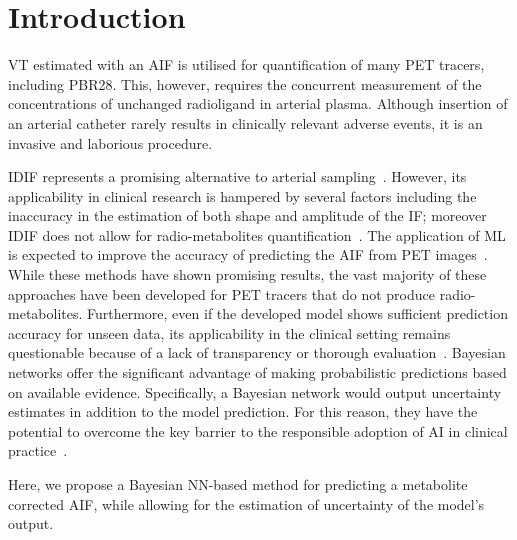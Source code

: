 \vspace{-0.5cm}

\section{Introduction} \label{sec:introduction}\vspace{-0.3cm}\vspace{0.2cm}
     \gls{VT} estimated with an \gls{AIF} is utilised for quantification of many \gls{PET} tracers, including \gls{PBR28}. This, however, requires the concurrent measurement of the concentrations of unchanged radioligand in arterial plasma. Although insertion of an arterial catheter rarely results in clinically relevant adverse events, it is an invasive and laborious procedure. 
    
    \gls{IDIF} represents a promising alternative to arterial sampling~\cite{Zanotti-Fregonara2011}. However, its applicability in clinical research is hampered by several factors including the inaccuracy in the estimation of both shape and amplitude of the \gls{IF}; moreover \gls{IDIF} does not allow for radio-metabolites quantification~\cite{Sari2018Non-invasive11C-SB201745}. The application of \gls{ML} is expected to improve the accuracy of predicting the \gls{AIF} from \gls{PET} images~\cite{Kuttner2020, Ferrante2022PhysicallyImaging}. While these methods have shown promising results, the vast majority of these approaches have been developed for \gls{PET} tracers that do not produce radio-metabolites. Furthermore, even if the developed model shows sufficient prediction accuracy for unseen data, its applicability in the clinical setting remains questionable because of a lack of transparency or thorough evaluation~\cite{Salahuddin2022TransparencyMethods}. Bayesian networks offer the significant advantage of making probabilistic predictions based on available evidence. Specifically, a Bayesian network would output uncertainty estimates in addition to the model prediction. For this reason, they have the potential to overcome the key barrier to the responsible adoption of \gls{AI} in clinical practice~\cite{Prabhudesai2023LoweringAI}. 
    
    Here, we propose a Bayesian \gls{NN}-based method for predicting a metabolite corrected \gls{AIF}, while allowing for the estimation of uncertainty of the model's output.%

